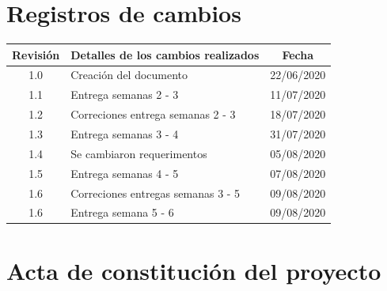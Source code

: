 \documentclass[11pt]{charter}
\begin{document}
\maketitle
\thispagestyle{empty}
\pagebreak


\thispagestyle{empty}
{\setlength{\parskip}{0pt}
\tableofcontents{}
}
\pagebreak


\section{Registros de cambios}
\label{sec:registro}


\begin{table}[ht]
\label{tab:registro}
\centering

\begin{tabularx}{\linewidth}{@{}|c|X|c|@{}}
\hline
\rowcolor[HTML]{C0C0C0} 
\hline
Revisión & \multicolumn{1}{c|}{\cellcolor[HTML]{C0C0C0}Detalles de los cambios realizados} & Fecha      \\ \hline
1.0      & Creación del documento                                                          & 22/06/2020 \\ \hline
1.1      & Entrega semanas 2 - 3                                         & 11/07/2020 \\ 
\hline
1.2      & Correciones entrega semanas 2 - 3 & 18/07/2020  \\
\hline
1.3      & Entrega semanas 3 - 4 & 31/07/2020  \\ \hline
1.4      & Se cambiaron requerimentos & 05/08/2020 \\ \hline
1.5      & Entrega semanas 4 - 5 & 07/08/2020  \\ \hline
1.6      & Correciones entregas semanas 3 - 5 & 09/08/2020  \\ \hline
1.6      & Entrega semana 5 - 6 & 09/08/2020  \\ \hline
\end{tabularx}
\end{table}

\pagebreak



\section{Acta de constitución del proyecto}
\label{sec:acta}
\end{document}
